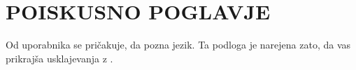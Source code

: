\section{POISKUSNO POGLAVJE}
Od uporabnika se pričakuje, da pozna jezik.
Ta podloga je narejena zato, da vas prikrajša usklajevanja z \cite{book:Navodila}.